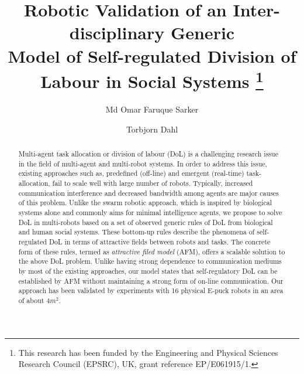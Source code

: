 \documentclass{llncs}
\begin{document}
\title{Robotic Validation of an Inter-disciplinary Generic\\
Model of Self-regulated Division of Labour in Social Systems
\thanks{This research has been funded by the Engineering and Physical Sciences Research Council (EPSRC), UK, grant reference EP/E061915/1.}
}
\author{Md Omar Faruque Sarker \and
Torbjorn Dahl %
}
\maketitle
\begin{abstract}
Multi-agent task allocation or division of labour (DoL) is a challenging research issue in the field of multi-agent and multi-robot systems. In order to address this issue, existing approaches such as, predefined (off-line) and emergent (real-time) task-allocation, fail to scale well with large number of robots. Typically, increased communication interference and decreased bandwidth among agents are major causes of this problem. Unlike the swarm robotic approach, which is inspired by biological systems alone and commonly aims for minimal intelligence agents, we propose to solve DoL in multi-robots based on a set of observed generic rules of DoL from biological and human social systems. These bottom-up rules describe the phenomena of self-regulated DoL in terms of attractive fields between robots and tasks. The concrete form of these rules, termed as \textit{attractive filed model} (AFM), offers a scalable solution to the above DoL problem. Unlike having strong dependence to communication mediums by most of the existing approaches, our model states that self-regulatory DoL can be established by AFM without maintaining a strong form of on-line communication. Our approach has been validated by experiments with 16 physical E-puck robots in an area of about 4$m^2$.
\end{abstract}
\end{document}
